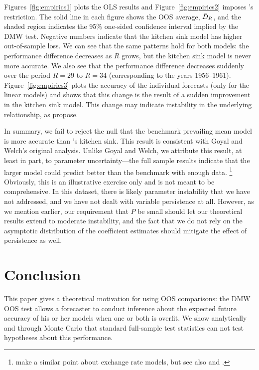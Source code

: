 \documentclass[11pt]{article}
\newcommand{\citepos}[1]{\citeauthor{#1}'s \citeyearpar{#1}}
\begin{document}
Figures~\ref{fig:empirics1} plots the OLS results and
Figure~\ref{fig:empirics2} imposes \citepos{CaT:08} restriction.  The
solid line in each figure shows the OOS average, $\bar{D}_{R}$, and the
shaded region indicates the 95\% one-sided confidence interval implied
by the DMW test.  Negative numbers indicate that the kitchen sink
model has higher out-of-sample loss.  We can see that the same
patterns hold for both models: the performance difference decreases as
$R$ grows, but the kitchen sink model is never more accurate.  We also
see that the performance difference decreases suddenly over the period
$R=29$ to $R=34$ (corresponding to the years 1956--1961).
Figure~\ref{fig:empirics3} plots the accuracy of the individual
forecasts (only for the linear models) and shows that this change is
the result of a sudden improvement in the kitchen sink model.  This
change may indicate instability in the underlying relationship, as
\citet{GoW:08} propose.

In summary, we fail to reject the null that the benchmark prevailing
mean model is more accurate than \citepos{GoW:08} kitchen sink.  This
result is consistent with Goyal and Welch's original analysis.  Unlike
Goyal and Welch, we attribute this result, at least in part, to
parameter uncertainty---the full sample results indicate that the
larger model could predict better than the benchmark with enough
data.%
\footnote{\citet{BWB:10} make a similar point about exchange rate
models, but see also \citet{Chi:10} and \citet{Gia:10}.} %
Obviously, this is an illustrative exercise only and is not meant to
be comprehensive.  In this dataset, there is likely parameter
instability that we have not addressed, and we have not dealt with
variable persistence at all.  However, as we mention earlier, our
requirement that $P$ be small should let our theoretical results
extend to moderate instability, and the fact that we do not rely on
the asymptotic distribution of the coefficient estimates should
mitigate the effect of persistence as well.
\section{Conclusion}\label{sec:conclusion}
This paper gives a theoretical motivation for using OOS comparisons:
the DMW OOS test allows a forecaster to conduct inference about
the expected future accuracy of his or her models when one or both is
overfit.  We show analytically and through Monte Carlo that standard
full-sample test statistics can not test hypotheses about this
performance.
\end{document}
